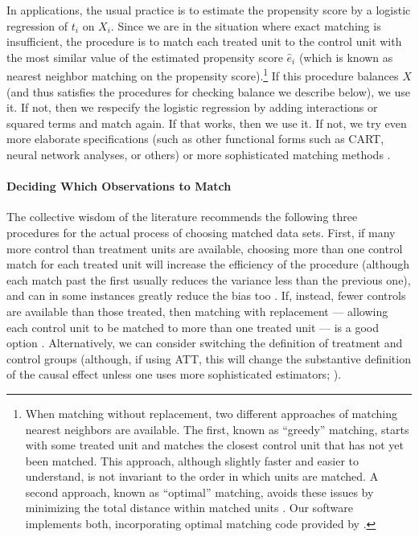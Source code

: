 \documentclass[11pt,titlepage]{article}
\begin{document}
In applications, the usual practice is to estimate the propensity
score by a logistic regression of $t_i$ on $X_i$.  Since we are in the
situation where exact matching is insufficient, the procedure is to
match each treated unit to the control unit with the most similar
value of the estimated propensity score $\hat{e}_i$ (which is known as
nearest neighbor matching on the propensity score).\footnote{When
  matching without replacement, two different approaches of matching
  nearest neighbors are available. The first, known as ``greedy''
  matching, starts with some treated unit and matches the closest
  control unit that has not yet been matched.  This approach, although
  slightly faster and easier to understand, is not invariant to the
  order in which units are matched.  A second approach, known as
  ``optimal'' matching, avoids these issues by minimizing the total
  distance within matched units \citep[e.g.,][]{Rosenbaum89}.  Our
  software implements both, incorporating optimal matching code
  provided by \citet{Hansen04}.}  If this procedure balances $X$ (and
thus satisfies the procedures for checking balance we describe below),
we use it.  If not, then we respecify the logistic regression by
adding interactions or squared terms and match again.  If that works,
then we use it.  If not, we try even more elaborate specifications
(such as other functional forms such as CART, neural network analyses,
or others) or more sophisticated matching methods
\citep{Frolich04,SmiTod05}.

\paragraph{Deciding Which Observations to Match}
The collective wisdom of the literature recommends the following three
procedures for the actual process of choosing matched data sets.
First, if many more control than treatment units are available,
choosing more than one control match for each treated unit will
increase the efficiency of the procedure (although each match past the
first usually reduces the variance less than the previous one), and
can in some instances greatly reduce the bias too \citep{Smith97}.
If, instead, fewer controls are available than those treated, then
matching with replacement --- allowing each control unit to be matched
to more than one treated unit --- is a good option \citep{DehWah99}.
Alternatively, we can consider switching the definition of treatment
and control groups (although, if using ATT, this will change the
substantive definition of the causal effect unless one uses more
sophisticated estimators; \citealt{Lechner00}).
\end{document}
